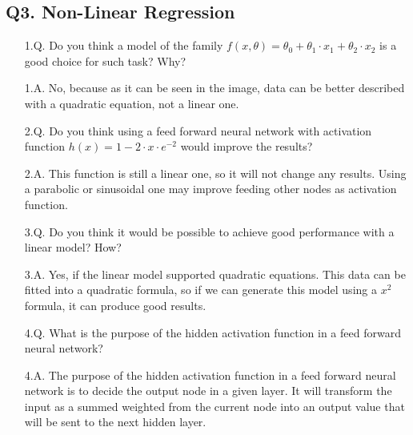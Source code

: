 \documentclass[11pt]{scrartcl}
\begin{document}
    \subsection{Q3. Non-Linear Regression}
    \begin{itemize}
        \item[1.Q.] Do you think a model of the family $f(x, \theta) = \theta_0 + \theta_1 \cdot x_1 + \theta_2 \cdot x_2$ is a good choice for such task? Why?
        \item[1.A.] No, because as it can be seen in the image, data can be better described with a quadratic equation, not a linear one.\\
        \item[2.Q.] Do you think using a feed forward neural network with activation function $h(x) = 1 - 2 \cdot x \cdot e^{-2}$ would improve the results?
        \item[2.A.] This function is still a linear one, so it will not change any results. Using a parabolic or sinusoidal one may improve feeding other nodes as activation function.\\
        \item[3.Q.] Do you think it would be possible to achieve good performance with a linear model? How?
        \item[3.A.] Yes, if the linear model supported quadratic equations. This data can be fitted into a quadratic formula, so if we can generate this model using a $x^2$ formula, it can produce good results.\\
        \item[4.Q.] What is the purpose of the hidden activation function in a feed forward neural network?
        \item[4.A.] The purpose of the hidden activation function in a feed forward neural network is to decide the output node in a given layer. It will transform the input as a summed weighted from the current node into an output value that will be sent to the next hidden layer.\\
    \end{itemize}
\end{document}
